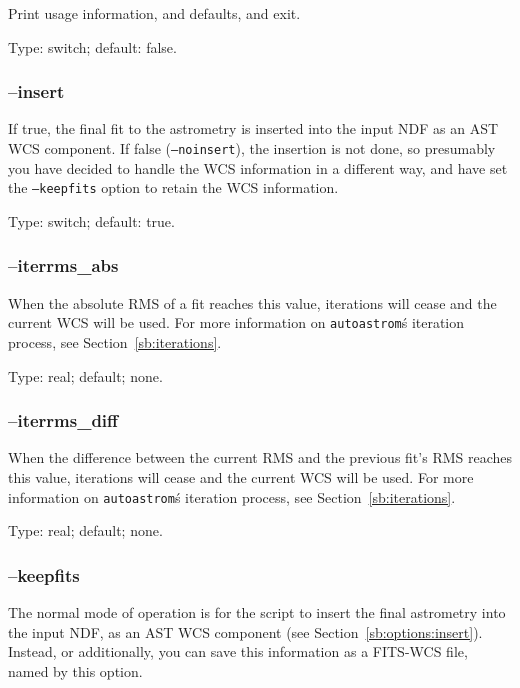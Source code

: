 \documentclass[twoside,11pt,nolof]{starlink}
\providecommand{\autoastrom}{\texttt{autoastrom}}
\begin{document}
Print usage information, and defaults, and exit.

Type: switch; default: false.

\subsubsection{--insert\label{sb:options:insert}}

If true, the final fit to the astrometry is inserted into the input NDF as an
AST WCS component.  If false (\texttt{--noinsert}), the insertion is not done,
so presumably you have decided to handle the WCS information in a different
way, and have set the \texttt{--keepfits} option to retain the WCS
information.

Type: switch; default: true.

\subsubsection{--iterrms\_abs\label{sb:options:iterrms_abs}}

When the absolute RMS of a fit reaches this value, iterations will cease and
the current WCS will be used. For more information on \autoastrom\'s iteration
process, see Section~\ref{sb:iterations}.

Type: real; default; none.

\subsubsection{--iterrms\_diff\label{sb:options:iterrms_diff}}

When the difference between the current RMS and the previous fit's RMS reaches
this value, iterations will cease and the current WCS will be used. For more
information on \autoastrom\'s iteration process, see
Section~\ref{sb:iterations}.

Type: real; default; none.

\subsubsection{--keepfits\label{sb:options:keepfits}}

The normal mode of operation is for the script to insert the final astrometry
into the input NDF, as an AST WCS component (see
Section~\ref{sb:options:insert}).  Instead, or additionally, you can save this
information as a FITS-WCS file, named by this option.
\end{document}
